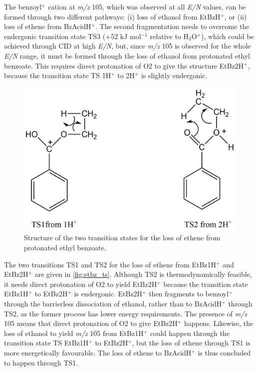 The benzoyl$^+$ cation at \textit{m/z} 105, which was observed at all \textit{E/N} values, can be formed through two different pathways:
(i) loss of ethanol from EtBzH$^+$, or
(ii) loss of ethene from BzAcidH$^+$.
%
The second fragmentation needs to overcome the endergonic transition state TS3 (+52 kJ mol$^{-1}$ relative to H$_3$O$^+$), which could be achieved through CID at high \textit{E/N}, but, since \textit{m/z} 105 is observed for the whole \textit{E/N} range, it must be formed through the loss of ethanol from protonated ethyl benzoate.
%
This requires direct protonation of O2 to give the structure EtBz2H$^+$, because the transition state TS 1H$^+$ to 2H$^+$ is slightly endergonic.


\begin{figure}[htbp]
\centering
\includegraphics[width=0.5\linewidth]{pics/cocaine-chapter/etbz_ts.png}
\caption{Structure of the two transition states for the loss of ethene  from protonated ethyl benzoate.}
\label{fig:etbz_ts}
\end{figure}

The two transitions TS1 and TS2 for the loss of ethene from EtBz1H$^+$ and EtBz2H$^+$ are given in \autoref{fig:etbz_ts}.
%
Although TS2 is thermodynamically feasible, it needs direct protonation of O2 to yield EtBz2H$^+$ because the transition state EtBz1H$^+$ to EtBz2H$^+$ is endergonic.
%
EtBz2H$^+$ then fragments to benzoyl$^+$ through the barrierless dissociation of ethanol, rather than to BzAcidH$^+$ through TS2, as the former process has lower energy requirements.
%
The presence of \textit{m/z} 105 means that direct protonation of O2 to give EtBz2H$^+$ happens.
%
Likewise, the loss of ethanol to yield \textit{m/z} 105 from EtBz1H$^+$ could happen through the transition state TS EtBz1H$^+$ to EtBz2H$^+$, but the loss of ethene through TS1 is more energetically favourable.
%
The loss of ethene to BzAcidH$^+$ is thus concluded to happen through TS1.

